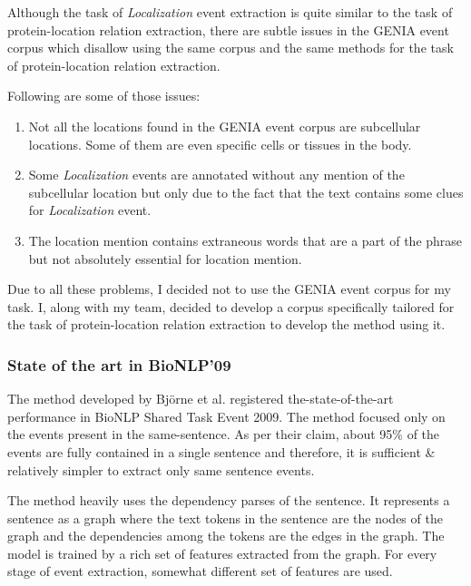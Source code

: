 Although the task of \textit{Localization} event extraction is quite similar to the task of protein-location relation extraction, there are subtle issues in the GENIA event corpus which disallow using the same corpus and the same methods for the task of protein-location relation extraction.

Following are some of those issues:

\begin{enumerate}

\item Not all the locations found in the GENIA event corpus are subcellular locations. Some of them are even specific cells or tissues in the body.

\item Some \textit{Localization} events are annotated without any mention of the subcellular location but only due to the fact that the text contains some clues for \textit{Localization} event.

\item The location mention contains extraneous words that are a part of the phrase but not absolutely essential for location mention.

\end{enumerate}

Due to all these problems, I decided not to use the GENIA event corpus for my task. I, along with my team, decided to develop a corpus specifically tailored for the task of protein-location relation extraction to develop the method using it.

\subsubsection{State of the art in BioNLP'09} \label{sec:JariBioNLP}

The method developed by Björne et al. \cite{bjorne2009extracting} registered the-state-of-the-art performance in BioNLP Shared Task Event 2009. The method focused only on the events present in the same-sentence. As per their claim, about 95\% of the events are fully contained in a single sentence and therefore, it is sufficient \& relatively simpler to extract only same sentence events.

The method heavily uses the dependency parses of the sentence. It represents a sentence as a graph where the text tokens in the sentence are the nodes of the graph and the dependencies among the tokens are the edges in the graph. The model is trained by a rich set of features extracted from the graph. For every stage of event extraction, somewhat different set of features are used. 

